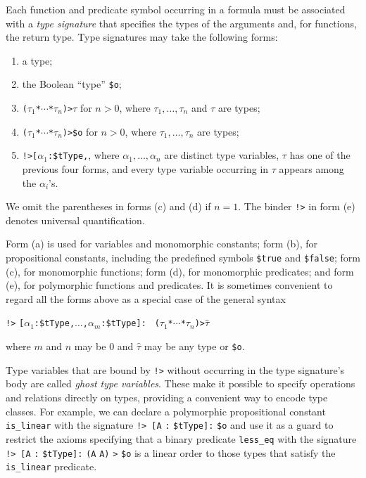 Each function and predicate symbol occurring in a formula must be associated
with a {\em type signature\/} that specifies the types of the arguments and, for
functions, the return type. Type signatures may take the following forms:
%
\begin{enumerate}
\item[(a)] a type;
\item[(b)] the Boolean ``type'' {\tt \$o}; %
\item[(c)] {\tt ($\tau_1$\;*\;${\cdots}$\;*\;$\tau_n$)\;>\;$\tau$} for $n > 0$,
where $\tau_1,\dots,\tau_n$ and $\tau$ are types;
\item[(d)] {\tt ($\tau_1$\;*\;${\cdots}$\;*\;$\tau_n$)\;>\;\$o} for $n > 0$,
where $\tau_1,\dots,\tau_n$ are types;
\item[(e)] {\tt !>\;[$\alpha_1$\::\:\$tType,}\;{\tt ${\dots}$,}\;{\tt
$\alpha_n$\::\:\$tType]:\;$\tau$}, where $\alpha_1,\dots,\alpha_n$ are distinct
type variables, $\tau$ has one of the previous four forms, and every type
variable occurring in $\tau$ appears among the $\alpha_i$'s.
\end{enumerate}
%
We omit the parentheses in forms (c) and (d) if $n = 1$. The binder {\tt !>} in
form (e) denotes %
universal quantification.

Form (a) is used for variables and monomorphic constants; form (b), for
propositional constants, including the predefined symbols {\tt \$true} and
{\tt \$false}; form (c), for monomorphic functions; form (d), for monomorphic
predicates; and form (e), for polymorphic functions and predicates.
It is sometimes convenient to regard all the forms above as a special case of
the general syntax
\begin{center}
{\tt !>} {\tt [$\alpha_1$\;:\;\$tType,\;${\dots}$,\;$\alpha_m$\;:\;\$tType]:} {\tt
($\tau_1$\;*\;${\cdots}$\;*\;$\tau_n$)\;>\;$\widehat \tau$}
\end{center}
where $m$ and $n$ may be 0 and $\widehat \tau$ may be any type or {\tt \$o}.

Type variables that are bound by {\tt !>} without
occurring in the type signature's body are called \emph{ghost type variables}.
These make it possible to specify operations and relations directly on types,
providing a convenient way to encode type classes.
For example, we can declare a polymorphic propositional
constant {\tt is\_linear} with the signature
{\tt !>}~{\tt [A} {\tt :} {\tt \$tType]:} {\tt \$o} and use it as a guard to restrict the
axioms specifying that a binary predicate {\tt less\_eq} with the signature
{\tt !>}~{\tt [A} {\tt :} {\tt \$tType]:} {\tt (A} {\tt *} {\tt A)} {\tt >} {\tt \$o}
is a linear order to those types that satisfy the {\tt is\_linear} predicate.

